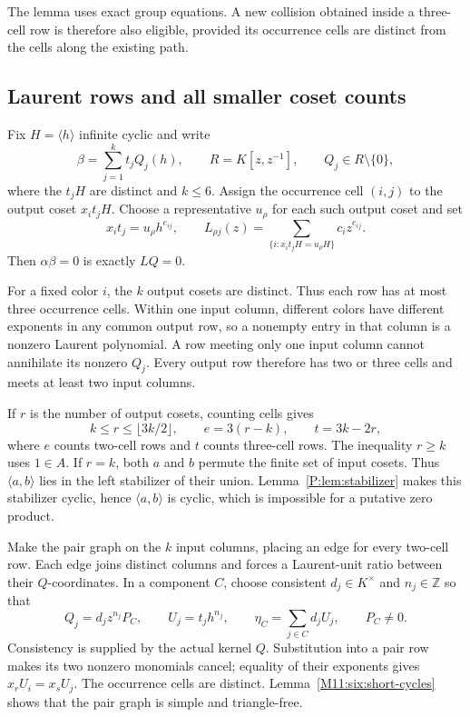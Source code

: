 \documentclass[11pt,a4paper,oneside]{report}
\theoremstyle{definition}
\theoremstyle{remark}
\newcommand{\Z}{\mathbb Z}
\begin{document}
The lemma uses exact group equations. A new collision obtained inside
a three-cell row is therefore also eligible, provided its occurrence
cells are distinct from the cells along the existing path.

\subsection{Laurent rows and all smaller coset counts}

Fix \(H=\langle h\rangle\) infinite cyclic and write
\[
 \beta=\sum_{j=1}^k t_jQ_j(h),\qquad
 R=K[z,z^{-1}],\qquad Q_j\in R\setminus\{0\},
\]
where the \(t_jH\) are distinct and \(k\le6\). Assign the occurrence
cell \((i,j)\) to the output coset \(x_it_jH\). Choose a representative
\(u_\rho\) for each such output coset and set
\[
 x_it_j=u_\rho h^{e_{ij}},\qquad
 L_{\rho j}(z)=
 \sum_{\{i:x_it_jH=u_\rho H\}}c_i z^{e_{ij}}.
\]
Then \(\alpha\beta=0\) is exactly \(LQ=0\).

For a fixed color \(i\), the \(k\) output cosets are distinct. Thus each
row has at most three occurrence cells. Within one input column,
different colors have different exponents in any common output row,
so a nonempty entry in that column is a nonzero Laurent polynomial.
A row meeting only one input column cannot annihilate its nonzero
\(Q_j\). Every output row therefore has two or three cells and meets
at least two input columns.

If \(r\) is the number of output cosets, counting cells gives
\begin{equation}\label{M11:six:counts}
 k\le r\le\lfloor3k/2\rfloor,\qquad
 e=3(r-k),\qquad t=3k-2r,
\end{equation}
where \(e\) counts two-cell rows and \(t\) counts three-cell rows.
The inequality \(r\ge k\) uses \(1\in A\).
If \(r=k\), both \(a\) and \(b\) permute the finite set of input cosets.
Thus \(\langle a,b\rangle\) lies in the left stabilizer of their union.
Lemma~\ref{P:lem:stabilizer} makes this stabilizer cyclic, hence
\(\langle a,b\rangle\) is cyclic, which is impossible for a putative
zero product.

Make the pair graph on the \(k\) input columns, placing an edge for every
two-cell row. Each edge joins distinct columns and forces a Laurent-unit
ratio between their \(Q\)-coordinates. In a component \(C\), choose
consistent \(d_j\in K^\times\) and \(n_j\in\Z\) so that
\[
 Q_j=d_jz^{n_j}P_C,\qquad
 U_j=t_jh^{n_j},\qquad
 \eta_C=\sum_{j\in C}d_jU_j,\qquad P_C\ne0.
\]
Consistency is supplied by the actual kernel \(Q\). Substitution into
a pair row makes its two nonzero monomials cancel; equality of their
exponents gives \(x_rU_i=x_sU_j\). The occurrence cells are distinct.
Lemma~\ref{M11:six:short-cycles} shows that the pair graph is simple and
triangle-free.
\end{document}
